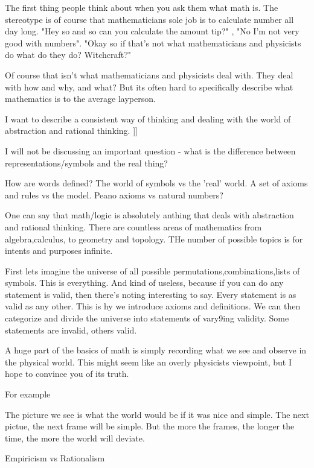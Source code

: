\documentclass{book}
\begin{document}
The first thing people think about when you ask them what math is. The stereotype is of course that mathematicians sole job is to calculate number all day long. 
"Hey so and so can you calculate the amount tip?" , "No I'm not very good with numbers".
"Okay so if that's not what mathematicians and physicists do what do they do? Witchcraft?"

Of course that isn't what mathematicians and physicists deal with. They deal with how and why, and what? But its often hard to specifically describe what mathematics is to the average layperson. 


I want to describe a consistent way of thinking and dealing with the world of abstraction and rational thinking. ]]

I will not be discussing an important question - 
what is the difference between representations/symbols and the real thing?

How are words defined?
The world of symbols vs the 'real' world.
A set of axioms and rules vs the model.
Peano axioms vs natural numbers?


One can say that math/logic is absolutely anthing that deals with abstraction and rational thinking. 
There are countless  areas of mathematics from algebra,calculus, to geometry and topology. THe number of possible topics is for intents and purposes infinite. 


First lets imagine the universe of all possible permutations,combinations,lists of symbols. This is everything.
And kind of useless, because if you can do any statement is valid, then there's noting interesting to say. Every statement is as valid as any other.
This is hy we introduce axioms and definitions. We can then categorize and divide the universe into statements of vary9ing validity. Some statements are invalid, others valid.  





A huge part of the basics of math is simply recording what we see and observe in the physical world. This might seem like an overly physicists viewpoint, but I hope to convince you of its truth.

For example

 
 The picture we see is what the world would be if it was nice and simple. The next pictue, the next frame will be simple. But the more the frames, the longer the time, the more the world will deviate. 
 
Empiricism vs Rationalism 
 
 
\end{document}
